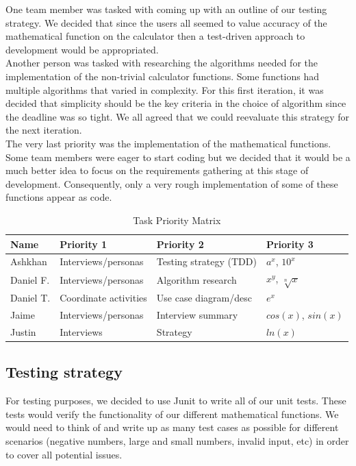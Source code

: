 \documentclass[a4paper]{article}
\begin{document}
One team member was tasked with coming up with an outline of our testing strategy. We decided that since the users all seemed to value accuracy of the mathematical function on the calculator then a test-driven approach to development would be appropriated. \\

Another person was tasked with researching the algorithms needed for the implementation of the non-trivial calculator functions. Some functions had multiple algorithms that varied in complexity. For this first iteration, it was decided that simplicity should be the key criteria in the choice of algorithm since the deadline was so tight. We all agreed that we could reevaluate this strategy for the next iteration. \\

The very last priority was the implementation of the mathematical functions. Some team members were eager to start coding but we decided that it would be a much better idea to focus on the requirements gathering at this stage of development. Consequently, only a very rough implementation of some of these functions appear as code. \\

\begin{table}[ht]
\centering
\caption{Task Priority Matrix}
\begin{tabular}{|l|l|l|l|}
\hline
\textbf{Name}&\textbf{Priority 1}  &\textbf{Priority 2}  &\textbf{Priority 3}  \\ \hline
 Ashkhan&Interviews/personas  &Testing strategy (TDD)  &$a^x$, $10^x$  \\ \hline
 Daniel F.&Interviews/personas  &Algorithm research  &$x^y$, $\sqrt[n]{x}$  \\ \hline
 Daniel T.&Coordinate activities  &Use case diagram/desc  &$e^x$  \\ \hline
 Jaime&Interviews/personas  &Interview summary  &$cos(x)$, $sin(x)$  \\ \hline
 Justin&Interviews  &Strategy  &$ln(x)$  \\ \hline
\end{tabular}
\end{table}

\subsection{Testing strategy}

For testing purposes, we decided to use Junit to write all of our unit tests. These tests would verify the functionality of our different mathematical functions. We would need to think of and write up as many test cases as possible for different scenarios (negative numbers, large and small numbers, invalid input, etc) in order to cover all potential issues. \\
\end{document}

